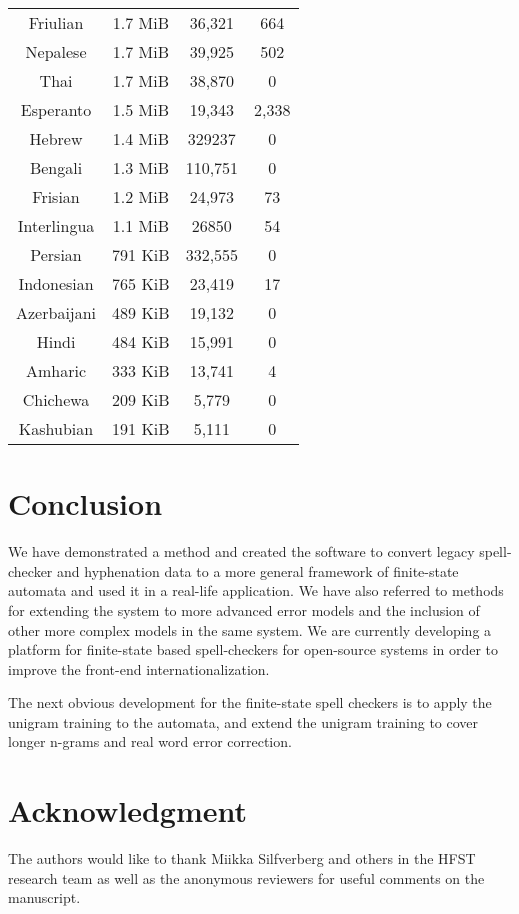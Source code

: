 \documentclass[postprint]{flammie}
\begin{document}
\begin{table}[tbp]
\begin{tabular}{c|c|c|c}
    Friulian & 1.7 MiB & 36,321 & 664 \\
    Nepalese & 1.7 MiB & 39,925 & 502 \\
    Thai & 1.7 MiB & 38,870 & 0 \\
    Esperanto & 1.5 MiB & 19,343 & 2,338 \\
    Hebrew & 1.4 MiB & 329237 & 0 \\
    Bengali & 1.3 MiB & 110,751 & 0 \\
    Frisian& 1.2 MiB & 24,973 & 73 \\
    Interlingua & 1.1 MiB & 26850 & 54 \\
    Persian & 791 KiB & 332,555 & 0 \\
    Indonesian & 765 KiB & 23,419 & 17 \\
    Azerbaijani & 489 KiB & 19,132 & 0 \\
    Hindi & 484 KiB & 15,991 & 0 \\
    Amharic & 333 KiB & 13,741 & 4 \\
    Chichewa & 209 KiB & 5,779 & 0 \\
    Kashubian & 191 KiB & 5,111 & 0 \\
    \hline
  \end{tabular}
\end{table}

\section{Conclusion}

We have demonstrated a method and created the software to convert legacy
spell-checker and hyphenation data to a more general framework of
finite-state automata and used it in a real-life application. We have
also referred to methods for extending the system to more advanced
error models and the inclusion of other more complex models in the
same system. We are currently developing a platform for finite-state
based spell-checkers for open-source systems in order to improve the
front-end internationalization.

The next obvious development for the finite-state spell checkers is to
apply the unigram training \cite{conf/lrec/Pirinen2010} to the automata,
and extend the unigram training to cover longer n-grams and real word
error correction.


\section*{Acknowledgment}

The authors would like to thank Miikka Silfverberg and others in the
HFST research team as well as the anonymous reviewers for useful comments on the
manuscript.




\end{document}
